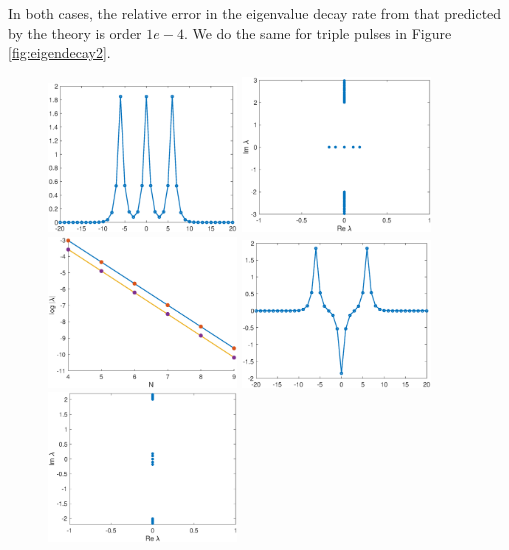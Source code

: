 \documentclass[12pt]{article}
\begin{document}
In both cases, the relative error in the eigenvalue decay rate from that predicted by the theory is order $1e-4$. We do the same for triple pulses in Figure \ref{fig:eigendecay2}.

\begin{figure}[H]
\centering
\includegraphics[width=5cm]{dnlsPPP.eps}
\includegraphics[width=5cm]{dnlsPPPeig.eps}
\includegraphics[width=5cm]{dnlsPPPdecay.eps}
\includegraphics[width=5cm]{dnlsPMP.eps}
\includegraphics[width=5cm]{dnlsPMPeig.eps}

\end{figure}
\end{document}
